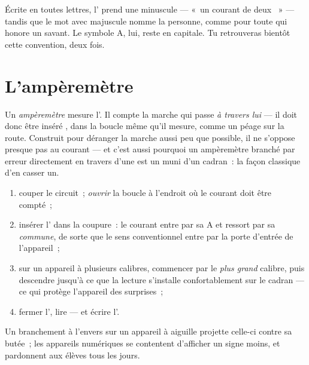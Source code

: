 \begin{remark}\label{rem:g8:intensity-ammeter:person}
Écrite en toutes lettres, l' prend une minuscule --- «~un
courant de deux ~» --- tandis que le mot avec majuscule nomme
la personne, comme pour toute  qui honore un savant. Le symbole
\unit{A}, lui, reste en capitale. Tu retrouveras bientôt cette
convention, deux fois.
\end{remark}

\section{L'ampèremètre}

\begin{definition}[Ampèremètre]\label{def:g8:intensity-ammeter:ammeter}
Un \emph{ampèremètre} mesure l'. Il
compte la marche qui passe \emph{à travers lui} --- il doit donc être
inséré \emph{}, dans la boucle même qu'il mesure, comme un
péage sur la route. Construit pour déranger la marche aussi peu que
possible, il ne s'oppose presque pas au courant --- et c'est aussi
pourquoi un ampèremètre branché par erreur directement en travers
d'une  est un  muni d'un cadran~: la façon classique
d'en casser un.
\end{definition}

\begin{method}\label{met:g8:intensity-ammeter:measure}
\begin{enumerate}
  \item couper le circuit~; \emph{ouvrir} la boucle à l'endroit où
        le courant doit être compté~;
  \item insérer l' dans la coupure~: le courant entre
        par sa  \unit{A} et ressort par sa 
        \emph{commune}, de sorte que le sens conventionnel entre
        par la porte d'entrée de l'appareil~;
  \item sur un appareil à plusieurs calibres, commencer par le
        \emph{plus grand} calibre, puis descendre jusqu'à ce que la
        lecture s'installe confortablement sur le cadran --- ce qui
        protège l'appareil des surprises~;
  \item fermer l', lire --- et écrire l'.
\end{enumerate}
Un branchement à l'envers sur un appareil à aiguille projette celle-ci
contre sa butée~; les appareils numériques se contentent d'afficher un
signe moins, et pardonnent aux élèves tous les jours.
\end{method}

